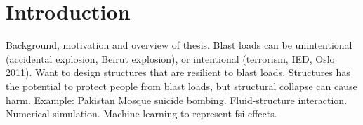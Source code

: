 \chapter{Introduction} \label{Ch1}
Background, motivation and overview of thesis.
Blast loads can be unintentional (accidental explosion, Beirut explosion), or intentional (terrorism, IED, Oslo 2011). Want to design structures that are resilient to blast loads. Structures has the potential to protect people from blast loads, but structural collapse can cause harm. Example: Pakistan Mosque suicide bombing.
Fluid-structure interaction. Numerical simulation. Machine learning to represent fsi effects.